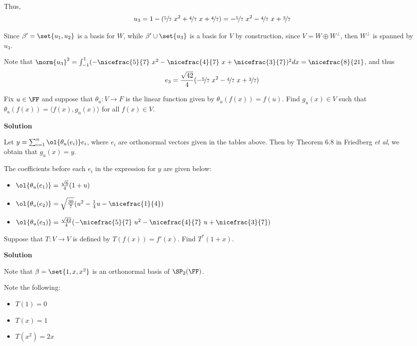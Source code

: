\documentclass[11pt]{scrartcl}
\begin{document}
Thus, 
\begin{align}
u_3 = 1 - (\nicefrac{5}{7}\ x^2 + \nicefrac{4}{7}\ x + \nicefrac{4}{7}) =
 -\nicefrac{5}{7}\ x^2 - \nicefrac{4}{7}\ x + \nicefrac{3}{7}
\end{align}

Since \(\beta' = \set{u_1, u_2}\) is a basis for \(W\), while
\(\beta'\cup\set{u_3}\) is a basis for \(V\) by construction, since \(V =
W\oplus W^{\bot}\), then \(W^{\perp}\) is spanned by \(u_3\).

Note that \(\norm{u_3}^2 = \int_{-1}^1 ( -\nicefrac{5}{7}\ x^2 -
\nicefrac{4}{7}\ x + \nicefrac{3}{7})^2 dx = \nicefrac{8}{21}\), and
thus
\[
e_3 =  \frac{\sqrt{42}}{4}(-\nicefrac{5}{7}\ x^2 - \nicefrac{4}{7}\ x + \nicefrac{3}{7})
\]

\begin{problem*}
Fix $u \in \FF$ and suppose that $\theta_u : V \to F$ is the linear function given by $\theta_u(f(x)) = f(u)$. Find $g_u(x) \in V$ such that $\theta_u(f(x)) = \langle f(x),g_u(x)\rangle$ for all $f(x) \in V$. 
\end{problem*}

\textbf{Solution}

Let \(y = \sum_{i=1}^n \ol{\theta_u(e_i)}e_i\), where \(e_i\) are
orthonormal vectors given in the tables above. Then by Theorem 6.8 in
Friedberg \emph{et al}, we obtain that \(g_u(x) = y\).

The coefficients before each \(e_i\) in the expression for \(y\) are given
below:
\begin{itemize}
\item  $\ol{\theta_u(e_1)} = \frac{\sqrt{6}}{4}(1+u)$
\item  $\ol{\theta_u(e_2)} = \sqrt{\frac{30}{7}}(u^2-\frac{1}{4}u - \nicefrac{1}{4})$
\item  $\ol{\theta_u(e_3)} = \frac{\sqrt{42}}{4}(-\nicefrac{5}{7}\ u^2 - \nicefrac{4}{7}\ u + \nicefrac{3}{7})$
\end{itemize}

\begin{problem*}
Suppose that $T : V \to V$ is defined by $T(f(x)) = f'(x)$. Find $T^*(1+x)$.
\end{problem*}

\textbf{Solution}

Note that \(\beta = \set{1, x, x^2}\) is an orthonormal basis of \(\SP_2(\FF)\).

Note the following:
\begin{itemize}
\item $T(1) = 0$
\item $T(x) = 1$
\item $T(x^2) = 2x$
\end{itemize}
\end{document}
